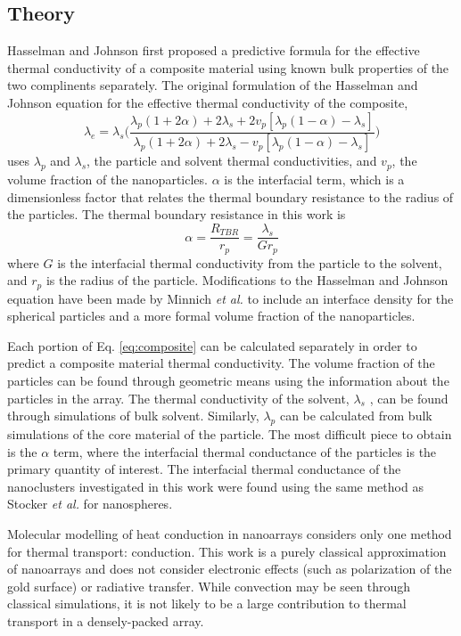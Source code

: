 \subsection{Theory}
Hasselman and Johnson first proposed a predictive formula for the effective thermal conductivity of a composite material using known bulk properties of the two complinents separately.\cite{Hasselman}
The original formulation of the Hasselman and Johnson equation for the effective thermal conductivity of the composite,
\begin{equation}
\label{eq:composite}
    \lambda_e = \lambda_s \bigg( \frac{\lambda_p (1+2\alpha)+2\lambda_s +2v_p[\lambda_p(1-\alpha)-\lambda_s]}{\lambda_p (1+2\alpha)+2\lambda_s -v_p[\lambda_p(1-\alpha)-\lambda_s]} \bigg)
\end{equation}
uses $\lambda_p$ and $\lambda_s$, the particle and solvent thermal conductivities, and $v_p$, the volume fraction of the nanoparticles. $\alpha$ is the interfacial term, which
is a dimensionless factor that relates the thermal boundary resistance to the radius of the particles.
The thermal boundary resistance in this work is
\begin{equation}
    \alpha = \frac{R_{TBR}}{r_p} = \frac{\lambda_s}{Gr_p}
\end{equation}
where $G$ is the interfacial thermal conductivity from the particle to the solvent, and $r_p$ is the radius of the particle.
Modifications to the Hasselman and Johnson equation have been made by Minnich \textit{et al.} to include an interface density for the spherical particles and a more formal volume fraction of the nanoparticles.\cite{Minnich2007}

Each portion of Eq. \ref{eq:composite} can be calculated separately in order to predict a composite material thermal conductivity. 
The volume fraction of the particles can be found through geometric means using the information about the particles in the array.
The thermal conductivity of the solvent, $\lambda_s$ , can be found through simulations of bulk solvent. 
Similarly, $\lambda_p$ can be calculated from bulk simulations of the core material of the particle. 
The most difficult piece to obtain is the $\alpha$ term, where the interfacial thermal conductance of the particles is the primary quantity of interest.
The interfacial thermal conductance of the nanoclusters investigated in this work were found using the same method as Stocker \textit{et al.} for nanospheres.\cite{Stocker2016}

Molecular modelling of heat conduction in nanoarrays considers only one method for thermal transport: conduction.
This work is a purely classical approximation of nanoarrays and does not consider electronic effects (such as polarization of the gold surface) or radiative transfer. 
While convection may be seen through classical simulations, it is not likely to be a large contribution to thermal transport in a densely-packed array. 
